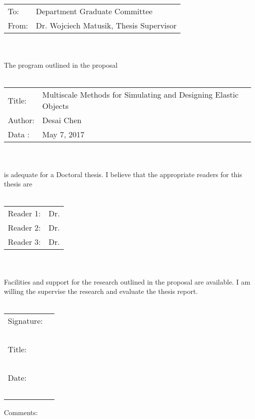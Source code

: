 \documentclass[11pt]{article}
\begin{document}
\begin{tabular}{p{2cm} p{6cm}}
	To: & Department Graduate Committee \\
	From: & Dr. Wojciech Matusik, Thesis Supervisor
\end{tabular}\\~\\
The program outlined in the proposal\\~\\
\begin{tabular}{p{2cm} l}
	Title: & Multiscale Methods for Simulating and Designing Elastic Objects\\
	Author: & Desai Chen\\
	Data : & May 7, 2017
\end{tabular}\\~\\
is adequate for a Doctoral thesis. I believe that the appropriate readers for this thesis are\\~\\
\begin{tabular}{p{2cm} l}
	Reader 1: & Dr.\\
	Reader 2: & Dr.\\
	Reader 3: & Dr.
\end{tabular}\\~\\
Facilities and support for the research outlined in the proposal are available.
I am willing the supervise the research and evaluate the thesis report.\\~\\
\begin{flushright}
	\begin{tabular}{l l}
		Signature: & \underline{\hspace{6cm}}\\~\\
		Title: & \underline{\hspace{6cm}}\\~\\
		Date: & \underline{\hspace{6cm}}\\~\\
	\end{tabular}
\end{flushright}
Comments:
\newpage
{}
\end{document}

